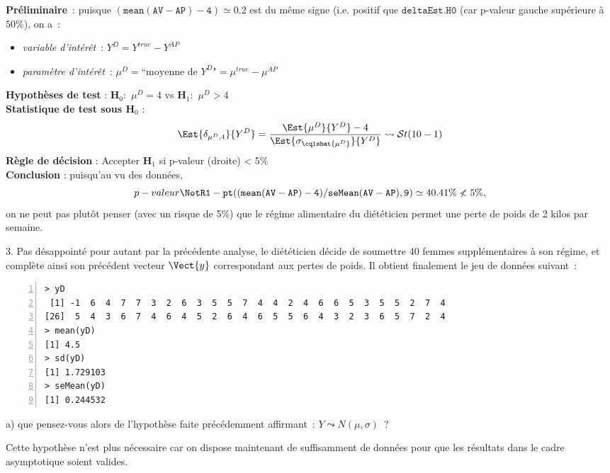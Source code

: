 \documentclass[10pt]{report}
\begin{document}
\begin{exercice}
\begin{Correction}
\noindent \textbf{Préliminaire}~: puisque  $\mathtt{(mean(AV-AP)-4)}\simeq0.2$ est du même signe (i.e. positif que $\mathtt{deltaEst.H0}$ (car p-valeur gauche supérieure à $50\%$), on a~:
    \begin{itemize}
\item \textit{variable d'intérêt}~: $Y^{D}=Y^{true}-Y^{AP}$
\item \textit{paramètre d'intérêt}~: $\mu^{D}=\mbox{``moyenne de $Y^{D}$"}=\mu^{true}-\mu^{AP}$
\end{itemize}
\noindent \textbf{Hypothèses de test} : $\mathbf{H}_0:$ $\mu^{D}=4$ vs {\large $\mathbf{H}_1:$ $\mu^{D}>4$}\\
\textbf{Statistique de test sous $\mathbf{H}_0$} :
  $$
  \Est{\delta_{\mu^{D},4}}{Y^{D}}= {\displaystyle \frac{\Est{\mu^{D}}{Y^{D}}-4}{
\Est{\sigma_{\cqlshat{\mu^{D}}}}{Y^{D}}
}} 
  \leadsto \mathcal{S}t(10-1)
  $$
\textbf{Règle de décision} : Accepter $\mathbf{H}_1$ si 
  p-valeur (droite) < 5\%\\
\noindent \textbf{Conclusion} :
puisqu'au vu des données, 
  \[
p-valeur\NotR\mathtt{1-pt((mean(AV-AP)-4)/seMean(AV-AP),9)} \simeq 40.41\%\nless5\%,
\]
on ne peut pas plutôt penser (avec un risque de 5\%) que le régime alimentaire du diététicien permet une perte de poids de 2 kilos par semaine.
\end{Correction}



3. Pas d{\'e}sappoint{\'e} pour autant par la pr{\'e}c{\'e}dente analyse, le di{\'e}t{\'e}ticien d{\'e}cide de soumettre 40 femmes suppl{\'e}mentaires {\`a} son r{\'e}gime, et compl{\`e}te ainsi son pr{\'e}c{\'e}dent vecteur $\Vect{y}$ correspondant aux pertes de poids. Il obtient finalement le jeu de donn{\'e}es suivant~:

\IndicR
\begin{Verbatim}[frame=leftline,fontfamily=tt,fontshape=n,numbers=left]
> yD
 [1] -1  6  4  7  7  3  2  6  3  5  5  7  4  4  2  4  6  6  5  3  5  5  2  7  4
[26]  5  4  3  6  7  4  6  4  5  2  6  4  6  5  5  6  4  3  2  3  6  5  7  2  4
> mean(yD)
[1] 4.5
> sd(yD)
[1] 1.729103
> seMean(yD)
[1] 0.244532
\end{Verbatim}
 
 
a) que pensez-vous alors de l'hypoth{\`e}se faite pr{\'e}c{\'e}demment affirmant~: $Y\leadsto N\left( \mu ,\sigma \right) $~?


\begin{Correction}
Cette hypothèse n'est plus nécessaire car on dispose maintenant de suffisamment de données pour que les résultats dans le cadre asymptotique soient valides.
\end{Correction}



\end{exercice}
\end{document}

